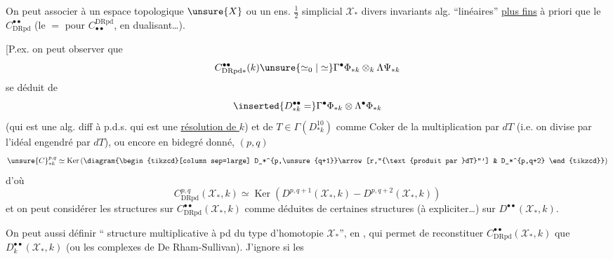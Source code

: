 
 On peut associer à un espace topologique $\unsure{X}$ ou un ens. $\frac12$ simplicial $\mathcal X_*$ divers invariants alg.  ``linéaires'' \uline{plus fins} à priori que le $C^{\bullet\bullet}_{\mathrm{DRpd}}$ (le $=$ pour $C_{\bullet\bullet}^{\mathrm{DRpd}}$, en dualisant\dots).

[P.ex. on peut observer que
\[
C^{\bullet\bullet}_{\mathrm{DRpd}*}(k)\unsure{\simeq_0|\simeq}\Gamma^\bullet\Phi_{*k}\otimes_k\Lambda\Psi_{*k}
\]
se déduit de
\[
\inserted{D^{\bullet\bullet}_{*k}=}\Gamma^\bullet\Phi_{*k}\otimes\Lambda^\bullet\Phi_{*k}
\]
(qui est une alg. diff  à p.d.s. qui est une \uline{résolution de $k$}) et de $T\in\Gamma(D^{10}_{*k})$ comme Coker de la multiplication par $dT$ (i.e. on divise par l'idéal engendré par $dT$), ou encore en bidegré donné,  $(p,q)$
\[
\unsure{C}^{p,q}_{*k}\simeq\operatorname{Ker}\left(\diagram{\begin{tikzcd}[column sep=large]
D_*^{p,\unsure{q+1}}\arrow[r,"{\text{produit par }dT}"'] & D_*^{p,q+2}
\end{tikzcd}}\right)
\]
d'où
\[
C^{p,q}_{\mathrm{DRpd}}(\mathcal X_*,k)\simeq\operatorname{Ker}(D^{p,q+1}(\mathcal X_*,k)-D^{p,q+2}(\mathcal X_*,k))
\]
et on peut considérer les structures  sur $C^{\bullet\bullet}_{\mathrm{DRpd}}(\mathcal X_*,k)$ comme déduites de certaines structures (à expliciter\dots) sur $D^{\bullet\bullet}(\mathcal X_*,k)$.

On peut aussi définir `` structure multiplicative à pd  du type d'homotopie $\mathcal X_*$'', en , qui permet de reconstituer   $C^{\bullet\bullet}_{\mathrm{DRpd}}(\mathcal X_*,k)$ que $D^{\bullet\bullet}_k(\mathcal X_*,k)$ (ou les complexes de De Rham-Sullivan). J'ignore si les

